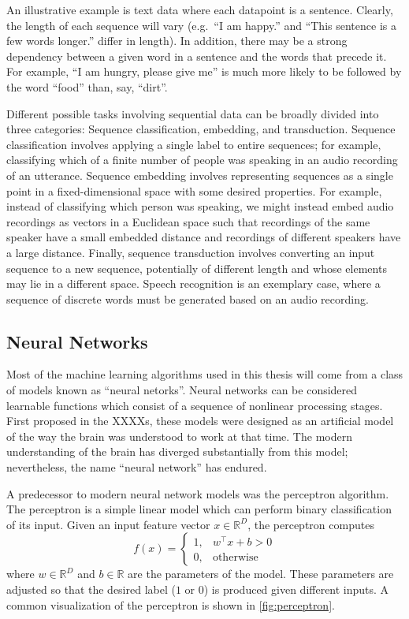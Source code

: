 An illustrative example is text data where each datapoint is a sentence.
Clearly, the length of each sequence will vary (e.g.\ ``I am happy.'' and ``This sentence is a few words longer.'' differ in length).
In addition, there may be a strong dependency between a given word in a sentence and the words that precede it.
For example, ``I am hungry, please give me'' is much more likely to be followed by the word ``food'' than, say, ``dirt''.

Different possible tasks involving sequential data can be broadly divided into three categories: Sequence classification, embedding, and transduction.
Sequence classification involves applying a single label to entire sequences; for example, classifying which of a finite number of people was speaking in an audio recording of an utterance.
Sequence embedding involves representing sequences as a single point in a fixed-dimensional space with some desired properties.
For example, instead of classifying which person was speaking, we might instead embed audio recordings as vectors in a Euclidean space such that recordings of the same speaker have a small embedded distance and recordings of different speakers have a large distance.
Finally, sequence transduction involves converting an input sequence to a new sequence, potentially of different length and whose elements may lie in a different space.
Speech recognition is an exemplary case, where a sequence of discrete words must be generated based on an audio recording.

\subsection{Neural Networks}

Most of the machine learning algorithms used in this thesis will come from a class of models known as ``neural netorks''.
Neural networks can be considered learnable functions which consist of a sequence of nonlinear processing stages.
First proposed in the XXXXs, these models were designed as an artificial model of the way the brain was understood to work at that time.
The modern understanding of the brain has diverged substantially from this model; nevertheless, the name ``neural network'' has endured.

A predecessor to modern neural network models was the perceptron algorithm.
The perceptron is a simple linear model which can perform binary classification of its input.
Given an input feature vector $x \in \mathbb{R}^D$, the perceptron computes
\begin{equation}
f(x) = \begin{cases}
1,& w^\top x + b > 0\\
0,& \mathrm{otherwise}
\end{cases}
\label{eq:perceptron}
\end{equation}
where $w \in \mathbb{R}^D$ and $b \in \mathbb{R}$ are the parameters of the model.
These parameters are adjusted so that the desired label ($1$ or $0$) is produced given different inputs.
A common visualization of the perceptron is shown in \cref{fig:perceptron}.

